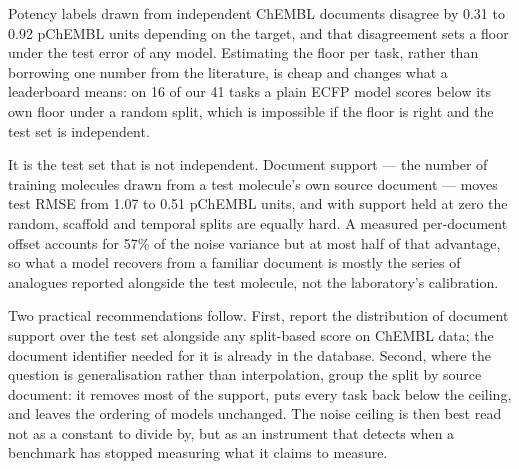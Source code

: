 Potency labels drawn from independent ChEMBL documents disagree by 0.31 to 0.92 pChEMBL units depending on the target, and that disagreement sets a floor under the test error of any model. Estimating the floor per task, rather than borrowing one number from the literature, is cheap and changes what a leaderboard means: on 16 of our 41 tasks a plain ECFP model scores below its own floor under a random split, which is impossible if the floor is right and the test set is independent.

It is the test set that is not independent. Document support --- the number of training molecules drawn from a test molecule's own source document --- moves test RMSE from 1.07 to 0.51 pChEMBL units, and with support held at zero the random, scaffold and temporal splits are equally hard. A measured per-document offset accounts for 57\% of the noise variance but at most half of that advantage, so what a model recovers from a familiar document is mostly the series of analogues reported alongside the test molecule, not the laboratory's calibration.

Two practical recommendations follow. First, report the distribution of document support over the test set alongside any split-based score on ChEMBL data; the document identifier needed for it is already in the database. Second, where the question is generalisation rather than interpolation, group the split by source document: it removes most of the support, puts every task back below the ceiling, and leaves the ordering of models unchanged. The noise ceiling is then best read not as a constant to divide by, but as an instrument that detects when a benchmark has stopped measuring what it claims to measure.
